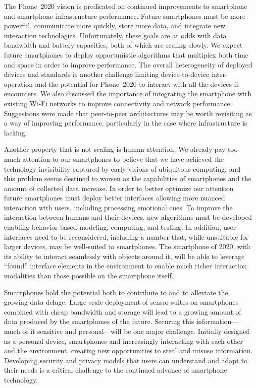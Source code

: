 The Phone~2020 vision is predicated on continued improvements to smartphone
and smartphone infrastructure performance. Future smartphones must be more
powerful, communicate more quickly, store more data, and integrate new
interaction technologies. Unfortunately, these goals are at odds with data
bandwidth and battery capacities, both of which are scaling slowly. We expect
future smartphones to deploy opportunistic algorithms that multiplex both
time and space in order to improve performance. The overall heterogeneity of
deployed devices and standards is another challenge limiting device-to-device
inter-operation and the potential for Phone~2020 to interact with all the
devices it encounters. We also discussed the importance of integrating the
smartphone with existing Wi-Fi networks to improve connectivity and network
performance. Suggestions were made that peer-to-peer architectures may be
worth revisiting as a way of improving performance, particularly in the case
where infrastructure is lacking.
 
Another property that is not scaling is human attention. We already pay too
much attention to our smartphones to believe that we have achieved the
technology invisibility captured by early visions of ubiquitous computing,
and this problem seems destined to worsen as the capabilities of smartphones
and the amount of collected data increase. In order to better optimize our
attention future smartphones must deploy better interfaces allowing more
nuanced interaction with users, including processing emotional cues. To
improve the interaction between humans and their devices, new algorithms must
be developed enabling behavior-based modeling, computing, and testing. In
addition, user interfaces need to be reconsidered, including a number that,
while unsuitable for larger devices, may be well-suited to smartphones. The
smartphone of 2020, with its ability to interact seamlessly with objects
around it, will be able to leverage ``found'' interface elements in the
environment to enable much richer interaction modalities than those possible
on the smartphone itself.
 
Smartphones hold the potential both to contribute to and to alleviate the
growing data deluge. Large-scale deployment of sensor suites on smartphones
combined with cheap bandwidth and storage will lead to a growing amount of
data produced by the smartphones of the future. Securing this
information---much of it sensitive and personal---will be one major
challenge. Initially designed as a personal device, smartphones and
increasingly interacting with each other and the environment, creating new
opportunities to steal and misuse information. Developing security and
privacy models that users can understand and adapt to their needs is a
critical challenge to the continued advance of smartphone technology.
 
